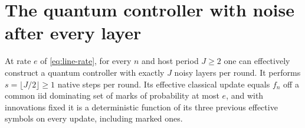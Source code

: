 \section{The quantum controller with noise after every layer}\label{sec:line-quantum}
\begin{lemma}\label{lem:line-qmarks}
At rate $e$ of \eqref{eq:line-rate}, for every $n$ and host period
$J\ge2$ one can effectively construct a quantum controller with exactly
$J$ noisy layers per round. It performs $s=\lfloor J/2\rfloor\ge1$
native steps per round. Its effective classical update equals $f_n$
off a common iid dominating set of marks of probability at most $e$,
and with innovations fixed it is a deterministic function of its
three previous effective symbols on every update, including marked ones.
\end{lemma}
